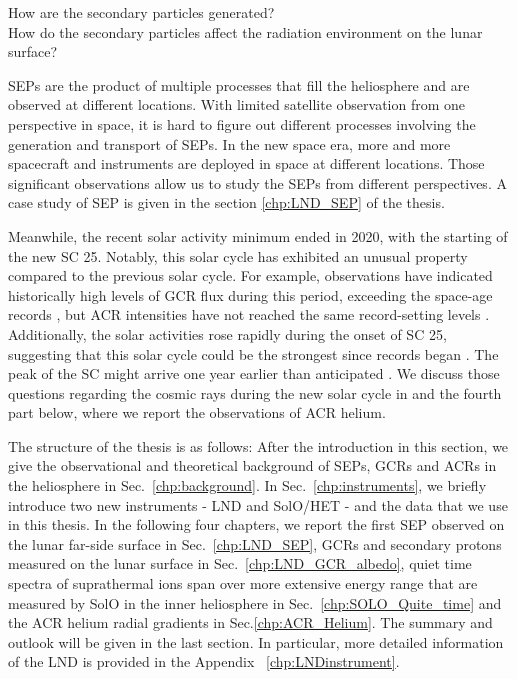 \begin{tcolorbox}[colback=blue!5!white,colframe=blue!75!black,title=Scientific questions - secondary particle]
	How are the secondary particles generated? \\
	How do the secondary particles affect the radiation environment on the lunar surface?

\end{tcolorbox}

\acp{SEP} are the product of multiple processes that fill the heliosphere and are observed at different locations. With limited satellite observation from one perspective in space, it is hard to figure out different processes involving the generation and transport of \acp{SEP}. In the new space era, more and more spacecraft and instruments are deployed in space at different locations. Those significant observations allow us to study the \acp{SEP} from different perspectives. A case study of \ac{SEP} is given in the section \ref{chp:LND_SEP} of the thesis.

Meanwhile, the recent solar activity minimum ended in 2020, with the starting of the new \ac{SC} 25. Notably, this solar cycle has exhibited an unusual property compared to the previous solar cycle. For example, observations have indicated historically high levels of \ac{GCR} flux during this period, exceeding the space-age records \citep{Fu2021ApJS, Xu2022FrASS}, but \ac{ACR} intensities have not reached the same record-setting levels \citet{Strauss2023ApJ}. 
Additionally, the solar activities rose rapidly during the onset of \ac{SC} 25, suggesting that this solar cycle could be the strongest since records began \citep{Nagovitsyn2023SoPh}. The peak of the \ac{SC} might arrive one year earlier than anticipated \citep{Prasad2023SoPh,McIntosh2020SoPh}. 
We discuss those questions regarding the cosmic rays during the new solar cycle in \citet{Xu2022FrASS,Mason-2021-SolOQuietTime} and the fourth part below, where we report the observations of \ac{ACR} helium.

The structure of the thesis is as follows: After the introduction in this section, we give the observational and theoretical background of \acp{SEP}, \acp{GCR} and \acp{ACR} in the heliosphere in Sec.~\ref{chp:background}. In Sec.~\ref{chp:instruments}, we briefly introduce two new instruments - \ac{LND} and \ac{SolO}/\ac{HET} - and the data that we use in this thesis. In the following four chapters, we report the first \ac{SEP} observed on the lunar far-side surface in Sec.~\ref{chp:LND_SEP}, \acp{GCR} and secondary protons measured on the lunar surface in Sec.~\ref{chp:LND_GCR_albedo}, quiet time spectra of suprathermal ions span over more extensive energy range that are measured by \ac{SolO} in the inner heliosphere in Sec.~\ref{chp:SOLO_Quite_time} and the \ac{ACR} helium radial gradients in Sec.\ref{chp:ACR_Helium}. The summary and outlook will be given in the last section.
In particular, more detailed information of the \ac{LND} is provided in the Appendix ~\ref{chp:LNDinstrument}.


